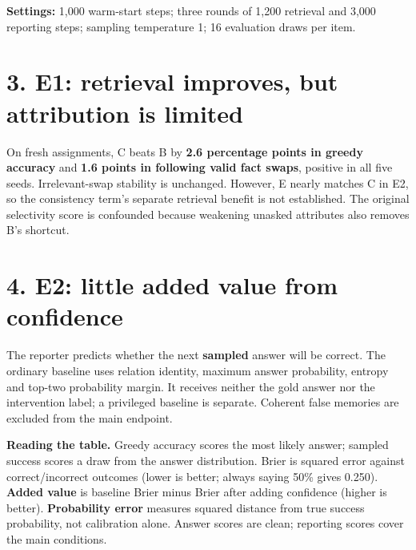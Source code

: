\documentclass[10pt,a4paper]{article}
\begin{document}
\textbf{Settings:} 1,000 warm-start steps; three rounds of 1,200 retrieval and 3,000 reporting steps; sampling temperature 1; 16 evaluation draws per item.
\par

\section*{3. E1: retrieval improves, but attribution is limited}

On fresh assignments, C beats B by \textbf{2.6 percentage points in greedy accuracy} and \textbf{1.6 points in following valid fact swaps}, positive in all five seeds. Irrelevant-swap stability is unchanged. However, E nearly matches C in E2, so the consistency term's separate retrieval benefit is not established. The original selectivity score is confounded because weakening unasked attributes also removes B's shortcut.
\par

\newpage

\section*{4. E2: little added value from confidence}

The reporter predicts whether the next \textbf{sampled} answer will be correct. The ordinary baseline uses relation identity, maximum answer probability, entropy and top-two probability margin. It receives neither the gold answer nor the intervention label; a privileged baseline is separate. Coherent false memories are excluded from the main endpoint.
\par

\textbf{Reading the table.} Greedy accuracy scores the most likely answer; sampled success scores a draw from the answer distribution. Brier is squared error against correct/incorrect outcomes (lower is better; always saying 50\% gives 0.250). \textbf{Added value} is baseline Brier minus Brier after adding confidence (higher is better). \textbf{Probability error} measures squared distance from true success probability, not calibration alone. Answer scores are clean; reporting scores cover the main conditions.
\par
\end{document}
